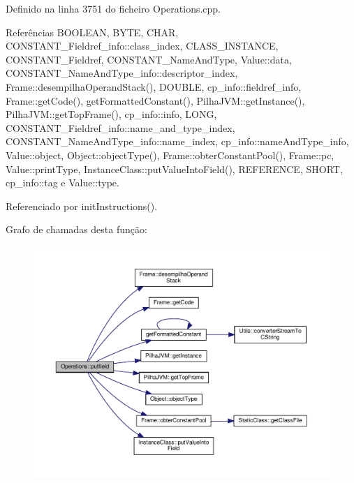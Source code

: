 Definido na linha 3751 do ficheiro Operations.\+cpp.



Referências B\+O\+O\+L\+E\+AN, B\+Y\+TE, C\+H\+AR, C\+O\+N\+S\+T\+A\+N\+T\+\_\+\+Fieldref\+\_\+info\+::class\+\_\+index, C\+L\+A\+S\+S\+\_\+\+I\+N\+S\+T\+A\+N\+CE, C\+O\+N\+S\+T\+A\+N\+T\+\_\+\+Fieldref, C\+O\+N\+S\+T\+A\+N\+T\+\_\+\+Name\+And\+Type, Value\+::data, C\+O\+N\+S\+T\+A\+N\+T\+\_\+\+Name\+And\+Type\+\_\+info\+::descriptor\+\_\+index, Frame\+::desempilha\+Operand\+Stack(), D\+O\+U\+B\+LE, cp\+\_\+info\+::fieldref\+\_\+info, Frame\+::get\+Code(), get\+Formatted\+Constant(), Pilha\+J\+V\+M\+::get\+Instance(), Pilha\+J\+V\+M\+::get\+Top\+Frame(), cp\+\_\+info\+::info, L\+O\+NG, C\+O\+N\+S\+T\+A\+N\+T\+\_\+\+Fieldref\+\_\+info\+::name\+\_\+and\+\_\+type\+\_\+index, C\+O\+N\+S\+T\+A\+N\+T\+\_\+\+Name\+And\+Type\+\_\+info\+::name\+\_\+index, cp\+\_\+info\+::name\+And\+Type\+\_\+info, Value\+::object, Object\+::object\+Type(), Frame\+::obter\+Constant\+Pool(), Frame\+::pc, Value\+::print\+Type, Instance\+Class\+::put\+Value\+Into\+Field(), R\+E\+F\+E\+R\+E\+N\+CE, S\+H\+O\+RT, cp\+\_\+info\+::tag e Value\+::type.



Referenciado por init\+Instructions().

Grafo de chamadas desta função\+:\nopagebreak
\begin{figure}[H]
\begin{center}
\leavevmode
\includegraphics[width=350pt]{classOperations_a56385f246d3d4d5c5674c988a1f0e658_cgraph}
\end{center}
\end{figure}
\mbox{\label{classOperations_ac6791ccfd8adf30d8f80b1f679f0b146}} 
